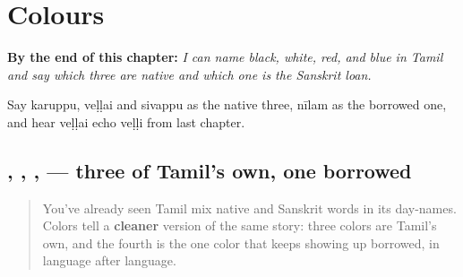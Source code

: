 
\chapter{Colours}
\label{ch:ta-colours}

\begin{chapteropening}
\textbf{By the end of this chapter:} \emph{I can name black, white, red, and blue in Tamil and say which three are native and which one is the Sanskrit loan.}

Say karuppu, veḷḷai and sivappu as the native three, nīlam as the borrowed one, and hear veḷḷai echo veḷḷi from last chapter.
\end{chapteropening}

\section[\texorpdfstring{\ta{கருப்பு} \ta{வெள்ளை} … (karuppu veḷḷai …)}{கருப்பு வெள்ளை … (karuppu veḷḷai …)}]{, , ,  — three of Tamil's own, one borrowed}

\label{lesson:TA-C11-nirangal}



\begin{quote}
You've already seen Tamil mix native and Sanskrit words in its day-names. Colors tell a \textbf{cleaner} version of the same story: three colors are Tamil's own, and the fourth is the one color that keeps showing up borrowed, in language after language.
\end{quote}

